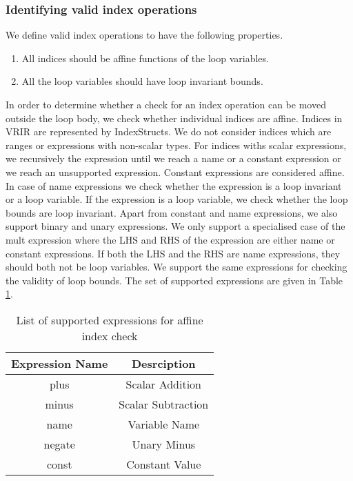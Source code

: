 \subsubsection{Identifying valid index operations}
We define valid index operations to have the following properties. 
\begin{enumerate}
\item All indices should be affine functions of the loop variables. 
\item All the loop variables should have loop invariant bounds. 
\end{enumerate}
In order to determine whether a check for an index operation can be moved outside the loop body, we check whether individual indices are affine. Indices in VRIR are represented by IndexStructs. We do not consider indices which are ranges or expressions with non-scalar types. For indices withs scalar expressions, we recursively the expression until we reach a name or a constant expression or we reach an unsupported expression. Constant expressions are considered affine. In  case of name expressions we check whether the expression is a loop invariant or a loop variable. If the expression is a loop variable, we check whether the loop bounds are loop invariant. Apart from constant and name expressions, we also support binary and unary expressions. We only support a specialised case of the mult expression where the LHS and RHS  of the expression are either name or constant expressions. If both the LHS and the RHS are name expressions, they should both not be loop variables. We support the same expressions for checking the validity of loop bounds. The set of supported expressions are given in Table \ref{tab:affineIndexCheck}. 
\begin{table}[htbp]
\centering
\begin{tabular}{|c|c|}
\hline
Expression Name & Desrciption        \\ \hline
plus            & Scalar Addition    \\ \hline
minus           & Scalar Subtraction \\ \hline
name            & Variable Name      \\ \hline
negate          & Unary Minus        \\ \hline
const           & Constant Value     \\ \hline
\end{tabular}
\caption{List of supported expressions for affine index check}
\label{tab:affineIndexCheck}
\end{table} 
